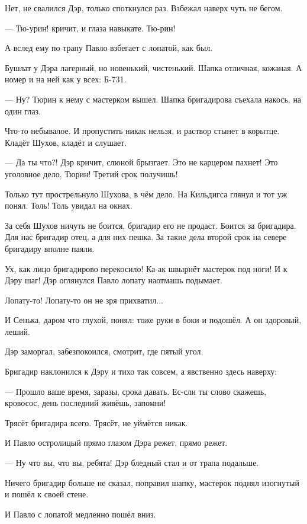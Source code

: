Нет, не свалился Дэр, только споткнулся раз. Взбежал наверх чуть не бегом.

--- Тю-урин! \dash кричит, и глаза навыкате. \Dash Тю-рин!

А вслед ему по трапу Павло взбегает с лопатой, как был.

Бушлат у Дэра лагерный, но новенький, чистенький. Шапка отличная, кожаная. А номер и на ней
как у всех: Б-731.

--- Ну? \dash Тюрин к нему с мастерком вышел. Шапка бригадирова съехала накось, на один глаз.

Что-то небывалое. И пропустить никак нельзя, и раствор стынет в корытце. Кладёт Шухов, кладёт
и слушает.

--- Да ты что?! \dash Дэр кричит, слюной брызгает. \Dash Это не карцером пахнет! Это уголовное дело,
Тюрин! Третий срок получишь!

Только тут прострельнуло Шухова, в чём дело. На Кильдигса глянул \dash и тот уж понял. Толь! Толь
увидал на окнах.

За себя Шухов ничуть не боится, бригадир его не продаст. Боится за бригадира. Для нас
бригадир \dash отец, а для них \dash пешка. За такие дела второй срок на севере бригадиру вполне
паяли.

Ух, как лицо бригадирово перекосило! Ка-ак швырнёт мастерок под ноги! И к Дэру \dash шаг! Дэр
оглянулся \dash Павло лопату наотмашь подымает.

Лопату-то! Лопату-то он не зря прихватил...

И Сенька, даром что глухой, \dash понял: тоже руки в боки и подошёл. А он здоровый, леший.

Дэр заморгал, забезпокоился, смотрит, где пятый угол.

Бригадир наклонился к Дэру и тихо так совсем, а явственно здесь наверху:

--- Прошло ваше время, заразы, срока давать. Ес-сли ты слово скажешь, кровосос, \dash день
последний живёшь, запомни!

Трясёт бригадира всего. Трясёт, не уймётся никак.

И Павло остролицый прямо глазом Дэра режет, прямо режет.

--- Ну что вы, что вы, ребята! \dash Дэр бледный стал \dash и от трапа подальше.

Ничего бригадир больше не сказал, поправил шапку, мастерок поднял изогнутый и пошёл к своей
стене.

И Павло с лопатой медленно пошёл вниз.

